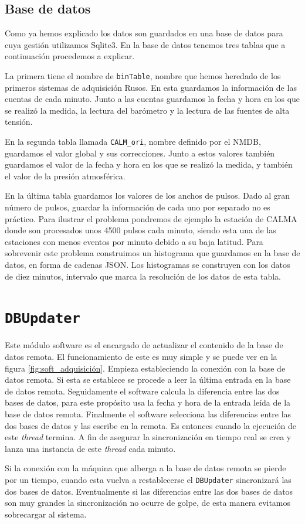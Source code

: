 	\subsection{Base de datos}
		Como ya hemos explicado los datos son guardados en una base de datos para cuya gestión utilizamos Sqlite3. En la base de datos tenemos
		tres tablas que a continuación procedemos a explicar.
	    	\par
		La primera tiene el nombre de \texttt{binTable}, nombre que hemos heredado de los primeros sistemas de adquisición Rusos. En esta
		guardamos la información de las cuentas de cada minuto. Junto a las cuentas guardamos la fecha y hora en los que se realizó la medida,
		la lectura del barómetro y la lectura de las fuentes de alta tensión.
	    	\par 
		En la segunda tabla llamada \texttt{CALM\_ori}, nombre definido por el NMDB, guardamos el valor global y sus correcciones.  Junto a
		estos valores también guardamos el valor de la fecha y hora en los que se realizó la medida, y también el valor de la presión
		atmosférica.
	    	\par
		En la última tabla guardamos los valores de los anchos de pulsos. Dado al gran número de pulsos, guardar la información de cada uno
		por separado no es práctico. Para ilustrar el problema pondremos de ejemplo la estación de CALMA donde son procesados unos 4500 pulsos
		cada minuto, siendo esta una de las estaciones con menos eventos por minuto debido a su baja latitud.  Para sobrevenir este problema
		construimos un histograma que guardamos en la base de datos, en forma de cadenas JSON\cite{JSON}. Los histogramas se construyen con
		los datos de diez minutos, intervalo que marca la resolución de los datos de esta tabla.

\section{\texttt{DBUpdater}}
	Este módulo software es el encargado de actualizar el contenido de la base de datos remota. El funcionamiento de este es muy simple y se puede
	ver en la figura \ref{fig:soft_adquisición}. Empieza estableciendo la conexión con la base de datos remota. Si esta se establece se procede a
	leer la última entrada en la base de datos remota. Seguidamente el software calcula la diferencia entre las dos bases de datos, para este
	propósito usa la fecha y hora de la entrada leída de la base de datos remota. Finalmente el software selecciona las diferencias entre las dos
	bases de datos y las escribe en la remota. Es entonces cuando la ejecución de este \emph{thread} termina.  A fin de asegurar la sincronización
	en tiempo real se crea y lanza una instancia de este \emph{thread} cada minuto.
	\par
	Si la conexión con la máquina que alberga a la base de datos remota se pierde por un tiempo, cuando esta vuelva a restablecerse el
	\texttt{DBUpdater} sincronizará las dos bases de datos. Eventualmente si las diferencias entre las dos bases de datos son muy grandes la
	sincronización no ocurre de golpe, de esta manera evitamos sobrecargar al sistema.

